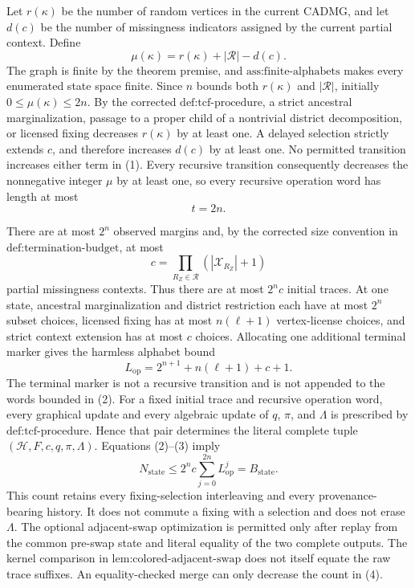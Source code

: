 Let \(r(\kappa)\) be the number of random vertices in the current CADMG, and let \(d(c)\) be the number of missingness indicators assigned by the current partial context. Define
\[
\mu(\kappa)=r(\kappa)+|\mathcal R|-d(c).
\tag{1}
\]
The graph is finite by the theorem premise, and \(\text{ass:finite-alphabets}\) makes every enumerated state space finite. Since \(n\) bounds both \(r(\kappa)\) and \(|\mathcal R|\), initially \(0\leq\mu(\kappa)\leq2n\). By the corrected \(\text{def:tcf-procedure}\), a strict ancestral marginalization, passage to a proper child of a nontrivial district decomposition, or licensed fixing decreases \(r(\kappa)\) by at least one. A delayed selection strictly extends \(c\), and therefore increases \(d(c)\) by at least one. No permitted transition increases either term in (1). Every recursive transition consequently decreases the nonnegative integer \(\mu\) by at least one, so every recursive operation word has length at most
\[
t=2n.
\tag{2}
\]

There are at most \(2^n\) observed margins and, by the corrected size convention in \(\text{def:termination-budget}\), at most
\[
c=\prod_{R_Z\in\mathcal R}(|\mathcal X_{R_Z}|+1)
\]
partial missingness contexts. Thus there are at most \(2^n c\) initial traces. At one state, ancestral marginalization and district restriction each have at most \(2^n\) subset choices, licensed fixing has at most \(n(\ell+1)\) vertex-license choices, and strict context extension has at most \(c\) choices. Allocating one additional terminal marker gives the harmless alphabet bound
\[
L_{\mathrm{op}}=2^{n+1}+n(\ell+1)+c+1.
\tag{3}
\]
The terminal marker is not a recursive transition and is not appended to the words bounded in (2). For a fixed initial trace and recursive operation word, every graphical update and every algebraic update of \(q\), \(\pi\), and \(\Lambda\) is prescribed by \(\text{def:tcf-procedure}\). Hence that pair determines the literal complete tuple \((\mathcal H,F,c,q,\pi,\Lambda)\). Equations (2)--(3) imply
\[
N_{\mathrm{state}}
\leq 2^n c\sum_{j=0}^{2n}L_{\mathrm{op}}^j
=B_{\mathrm{state}}.
\tag{4}
\]
This count retains every fixing-selection interleaving and every provenance-bearing history. It does not commute a fixing with a selection and does not erase \(\Lambda\). The optional adjacent-swap optimization is permitted only after replay from the common pre-swap state and literal equality of the two complete outputs. The kernel comparison in \(\text{lem:colored-adjacent-swap}\) does not itself equate the raw trace suffixes. An equality-checked merge can only decrease the count in (4).

